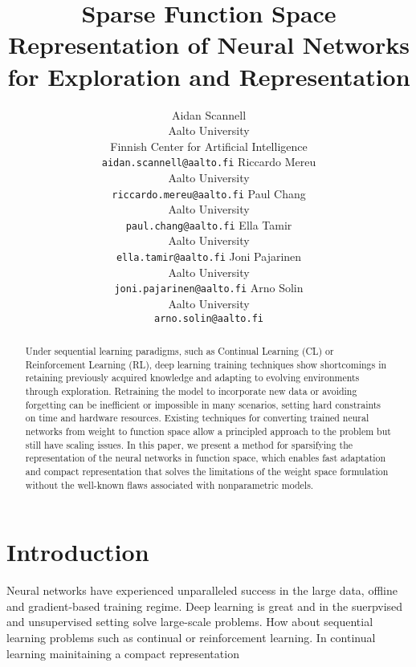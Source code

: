 \documentclass{article}
\title{Sparse Function Space Representation of Neural Networks for Exploration and Representation}
\author{%
  Aidan Scannell\textsuperscript{\star} \\
  Aalto University \\
  Finnish Center for Artificial Intelligence \\
  \texttt{aidan.scannell@aalto.fi}
  \And
  Riccardo Mereu\textsuperscript{\star} \\
  Aalto University\\
  \texttt{riccardo.mereu@aalto.fi}
  \And
  Paul Chang \\
  Aalto University\\
  \texttt{paul.chang@aalto.fi}
  \And
  Ella Tamir \\
  Aalto University\\
  \texttt{ella.tamir@aalto.fi}
  \And
  Joni Pajarinen \\
  Aalto University\\
  \texttt{joni.pajarinen@aalto.fi}
  \And
  Arno Solin \\
  Aalto University\\
  \texttt{arno.solin@aalto.fi}
}
\begin{document}
\maketitle

\begin{abstract}
Under sequential learning paradigms, such as Continual Learning (CL) or Reinforcement Learning (RL), deep learning training techniques show shortcomings in retaining previously acquired knowledge and adapting to evolving environments through exploration.
Retraining the model to incorporate new data or avoiding forgetting can be inefficient or impossible in many scenarios, setting hard constraints on time and hardware resources.
Existing techniques for converting trained neural networks from weight to function space allow a principled approach to the problem but still have scaling issues. In this paper, we present a method for sparsifying the representation of the neural networks in function space, which enables fast adaptation and compact representation that solves the limitations of the weight space formulation without the well-known flaws associated with nonparametric models.
\end{abstract}

\section{Introduction}
\label{sec:intro}
%
Neural networks have experienced unparalleled success in the large data, offline and gradient-based training regime. 
Deep learning is great and in the suerpvised and unsupervised setting solve large-scale problems.
How about sequential learning problems such as continual or reinforcement learning.
In continual learning mainitaining a compact representation
\end{document}
